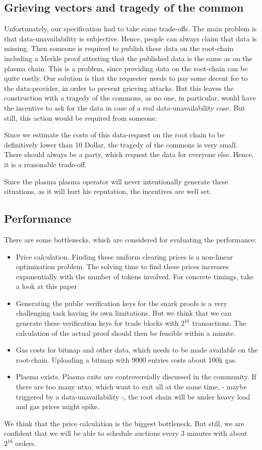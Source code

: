 \documentclass[11pt,parskip=full]{scrartcl}%
\begin{document}
\subsection{Grieving vectors and tragedy of the common}
Unfortunately, our specification had to take some trade-offs. 
The main problem is that data-unavailability is subjective. 
Hence, people can always claim that data is missing. 
Then someone is required to publish these data on the root-chain including a Merkle proof attesting that the published data is the same as on the plasma chain. 
This is a problem, since providing data on the root-chain can be quite costly. 
Our solution is that the requester needs to pay some decent fee to the data-provider, in order to prevent grieving attacks. 
But this leaves the construction with a tragedy of the commons, as no one, in particular, would have the incentive to ask for the data in case of a real data-unavailability case. 
But still, this action would be required from someone. 

Since we estimate the costs of this data-request on the root chain to be definitively lower than 10 Dollar, the tragedy of the commons is very small. 
There should always be a party, which request the data for everyone else. Hence, it is a reasonable trade-off. 

Since the plasma plasma operator will never intentionally generate these situations, as it will hurt his reputation, the incentives are well set. 

\subsection{Performance}
There are some bottlenecks, which are considered for evaluating the performance:
\begin{itemize}
\item Price calculation. 
Finding these uniform clearing prices is a non-linear optimization problem. 
The solving time to find these prices increases exponentially with the number of tokens involved. For concrete timings, take a look at this paper \cite{priceOptimization}
\item Generating the public verification keys for the snark proofs is a very challenging task having its own limitations. 
But we think that we can generate these verification keys for trade blocks with $2^{16}$ transactions. 
The calculation of the actual proof should then be feasible within a minute. 
\item Gas costs for bitmap and other data, which needs to be made available on the root-chain. 
Uploading a bitmap with 9000 entries costs about 100k gas. 
\item Plasma exists.
Plasma exits are controversially discussed in the community. 
If there are too many utxo, which want to exit all at the same time, - maybe triggered by a data-unavailability -, the root chain will be under heavy load and gas prices might spike. 
\end{itemize}
We think that the price calculation is the biggest bottleneck. 
But still, we are confident that we will be able to schedule auctions every 3 minutes with about $2^{16}$ orders. 
\end{document}
